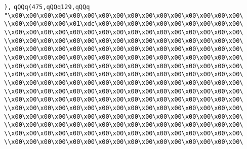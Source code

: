 \verb|),|\newline
\verb|qQQq(475,qQQq129,qQQq|\newline
\verb|"\x00\x00\x00\x00\x00\x00\x00\x00\x00\x00\x00\x00\x00\x00\x00\x00\|\newline
\verb|\\x00\x00\x00\x00\x01\xdc\x00\x00\x00\x00\x00\x00\x00\x00\x00\x00\|\newline
\verb|\\x00\x00\x00\x00\x00\x00\x00\x00\x00\x00\x00\x00\x00\x00\x00\x00\|\newline
\verb|\\x00\x00\x00\x00\x00\x00\x00\x00\x00\x00\x00\x00\x00\x00\x00\x00\|\newline
\verb|\\x00\x00\x00\x00\x00\x00\x00\x00\x00\x00\x00\x00\x00\x00\x00\x00\|\newline
\verb|\\x00\x00\x00\x00\x00\x00\x00\x00\x00\x00\x00\x00\x00\x00\x00\x00\|\newline
\verb|\\x00\x00\x00\x00\x00\x00\x00\x00\x00\x00\x00\x00\x00\x00\x00\x00\|\newline
\verb|\\x00\x00\x00\x00\x00\x00\x00\x00\x00\x00\x00\x00\x00\x00\x00\x00\|\newline
\verb|\\x00\x00\x00\x00\x00\x00\x00\x00\x00\x00\x00\x00\x00\x00\x00\x00\|\newline
\verb|\\x00\x00\x00\x00\x00\x00\x00\x00\x00\x00\x00\x00\x00\x00\x00\x00\|\newline
\verb|\\x00\x00\x00\x00\x00\x00\x00\x00\x00\x00\x00\x00\x00\x00\x00\x00\|\newline
\verb|\\x00\x00\x00\x00\x00\x00\x00\x00\x00\x00\x00\x00\x00\x00\x00\x00\|\newline
\verb|\\x00\x00\x00\x00\x00\x00\x00\x00\x00\x00\x00\x00\x00\x00\x00\x00\|\newline
\verb|\\x00\x00\x00\x00\x00\x00\x00\x00\x00\x00\x00\x00\x00\x00\x00\x00\|\newline
\verb|\\x00\x00\x00\x00\x00\x00\x00\x00\x00\x00\x00\x00\x00\x00\x00\x00\|\newline
\verb|\\x00\x00\x00\x00\x00\x00\x00\x00\x00\x00\x00\x00\x00\x00\x00\x00\|\newline
